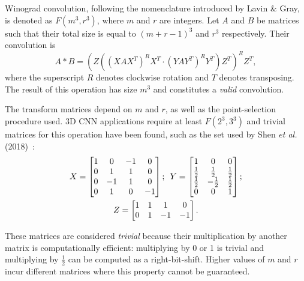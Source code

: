 Winograd convolution, following the nomenclature introduced by Lavin \& Gray, is denoted as $F(m^3,r^3)$, where $m$ and $r$ are integers. Let $A$ and $B$ be matrices such that their total size is equal to $(m+r-1)^3$ and $r^3$ respectively. Their convolution is
%
\begin{equation}\label{eq:wino3d}
  A*B = (Z( (XAX^T)^RX^T \cdot (YAY^T)^RY^T )Z^T)^RZ^T,
\end{equation}%
%
where the superscript $R$ denotes clockwise rotation and $T$ denotes transposing. The result of this operation has size $m^3$ and constitutes a \textit{valid} convolution.

The transform matrices depend on $m$ and $r$, as well as the point-selection procedure used. 3D CNN applications require at least $F(2^3,3^3)$ and trivial matrices for this operation have been found, such as the set used by Shen \textit{et al.} (2018)~\cite{shen2018towards}:
%
\begin{equation*}
  \begin{gathered}
    X = 
    \begin{bmatrix}
      1 &  0 & -1 &  0\\
      0 &  1 &  1 &  0\\
      0 & -1 &  1 &  0\\
      0 &  1 &  0 & -1
    \end{bmatrix};\enskip
    Y = 
    \begin{bmatrix}
      1 & 0 & 0\\
      \frac{1}{2} & \frac{1}{2} & \frac{1}{2}\\
      \frac{1}{2} & -\frac{1}{2} & \frac{1}{2}\\
      0 & 0 & 1
    \end{bmatrix};\\
    Z = 
    \begin{bmatrix}
      1 &  1 &  1 &  0\\
      0 &  1 & -1 & -1
    \end{bmatrix}.
  \end{gathered}
\end{equation*}

These matrices are considered \textit{trivial} because their multiplication by another matrix is computationally efficient: multiplying by 0 or 1 is trivial and multiplying by $\frac{1}{2}$ can be computed as a right-bit-shift. Higher values of $m$ and $r$ incur different matrices where this property cannot be guaranteed.

